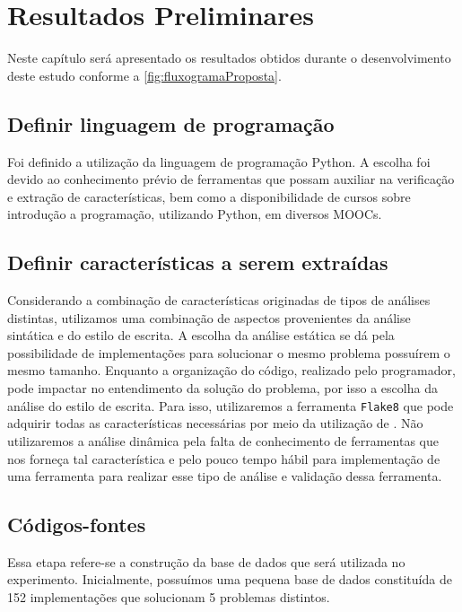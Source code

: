 \chapter{Resultados Preliminares}
\label{chap:Result}

	Neste capítulo será apresentado os resultados obtidos durante o desenvolvimento
	deste estudo conforme a \cref{fig:fluxogramaProposta}.

	\section{Definir linguagem de programação}
		Foi definido a utilização da linguagem de programação Python. A escolha foi
		devido ao conhecimento prévio de ferramentas que possam auxiliar na verificação
		e extração de características, bem como a disponibilidade de cursos sobre
		introdução a programação, utilizando Python, em diversos MOOCs.

	\section{Definir características a serem extraídas}
		Considerando a combinação de características originadas de tipos de análises
		distintas, utilizamos uma combinação de aspectos provenientes da análise
		sintática e do estilo de escrita. A escolha da análise estática se dá pela
		possibilidade de implementações para solucionar o mesmo problema possuírem
		o mesmo tamanho. Enquanto a organização do código, realizado pelo programador,
		pode impactar no entendimento da solução do problema, por isso a escolha da
		análise do estilo de escrita. Para isso, utilizaremos a ferramenta \texttt{Flake8}
		\cite{flake8} que pode adquirir todas as características necessárias por meio da
		utilização de . Não utilizaremos a análise dinâmica pela falta
		de conhecimento de ferramentas que nos forneça tal característica e pelo pouco
		tempo hábil para implementação de uma ferramenta para realizar esse tipo de
		análise e validação dessa ferramenta.

	\section{Códigos-fontes}	
		Essa etapa refere-se a construção da base de dados que será utilizada no experimento.
		Inicialmente, possuímos uma pequena base de dados constituída de 152 implementações
		que solucionam 5 problemas distintos.
		
